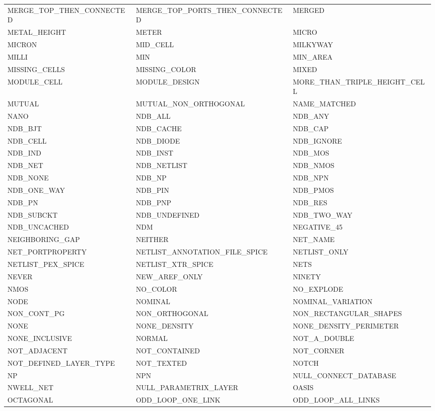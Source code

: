 \begin{longtable}{@{}>{\raggedright\arraybackslash\ttfamily}p{} >{\raggedright\arraybackslash\ttfamily}p{} >{\raggedright\arraybackslash\ttfamily}p{}@{}}
MERGE\_TOP\_THEN\_CONNECTED & MERGE\_TOP\_PORTS\_THEN\_CONNECTED & MERGED \\
METAL\_HEIGHT & METER & MICRO \\
MICRON & MID\_CELL & MILKYWAY \\
MILLI & MIN & MIN\_AREA \\
MISSING\_CELLS & MISSING\_COLOR & MIXED \\
MODULE\_CELL & MODULE\_DESIGN & MORE\_THAN\_TRIPLE\_HEIGHT\_CELL \\
MUTUAL & MUTUAL\_NON\_ORTHOGONAL & NAME\_MATCHED \\
NANO & NDB\_ALL & NDB\_ANY \\
NDB\_BJT & NDB\_CACHE & NDB\_CAP \\
NDB\_CELL & NDB\_DIODE & NDB\_IGNORE \\
NDB\_IND & NDB\_INST & NDB\_MOS \\
NDB\_NET & NDB\_NETLIST & NDB\_NMOS \\
NDB\_NONE & NDB\_NP & NDB\_NPN \\
NDB\_ONE\_WAY & NDB\_PIN & NDB\_PMOS \\
NDB\_PN & NDB\_PNP & NDB\_RES \\
NDB\_SUBCKT & NDB\_UNDEFINED & NDB\_TWO\_WAY \\
NDB\_UNCACHED & NDM & NEGATIVE\_45 \\
NEIGHBORING\_GAP & NEITHER & NET\_NAME \\
NET\_PORTPROPERTY & NETLIST\_ANNOTATION\_FILE\_SPICE & NETLIST\_ONLY \\
NETLIST\_PEX\_SPICE & NETLIST\_XTR\_SPICE & NETS \\
NEVER & NEW\_AREF\_ONLY & NINETY \\
NMOS & NO\_COLOR & NO\_EXPLODE \\
NODE & NOMINAL & NOMINAL\_VARIATION \\
NON\_CONT\_PG & NON\_ORTHOGONAL & NON\_RECTANGULAR\_SHAPES \\
NONE & NONE\_DENSITY & NONE\_DENSITY\_PERIMETER \\
NONE\_INCLUSIVE & NORMAL & NOT\_A\_DOUBLE \\
NOT\_ADJACENT & NOT\_CONTAINED & NOT\_CORNER \\
NOT\_DEFINED\_LAYER\_TYPE & NOT\_TEXTED & NOTCH \\
NP & NPN & NULL\_CONNECT\_DATABASE \\
NWELL\_NET & NULL\_PARAMETRIX\_LAYER & OASIS \\
OCTAGONAL & ODD\_LOOP\_ONE\_LINK & ODD\_LOOP\_ALL\_LINKS \\

\end{longtable}
